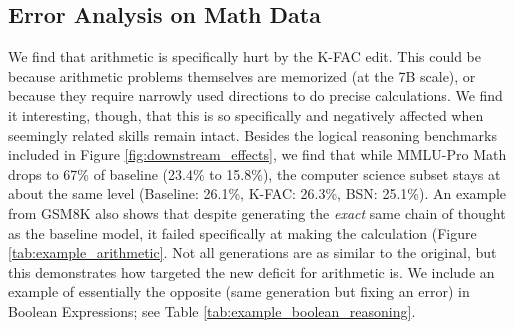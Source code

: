 \documentclass{article} %
\begin{document}
\subsection{Error Analysis on Math Data}
\label{sec:analysis_of_math}
We find that arithmetic is specifically hurt by the K-FAC edit. This could be because arithmetic problems themselves are memorized (at the 7B scale), or because they require narrowly used directions to do precise calculations. We find it interesting, though, that this is so specifically and negatively affected when seemingly related skills remain intact. Besides the logical reasoning benchmarks included in Figure \ref{fig:downstream_effects}, we find that while MMLU-Pro Math drops to 67\% of baseline (23.4\% to 15.8\%), the computer science subset stays at about the same level (Baseline:  26.1\%, K-FAC: 26.3\%, BSN: 25.1\%). 
An example from GSM8K also shows that despite generating the \textit{exact} same chain of thought as the baseline model, it failed specifically at making the calculation (Figure \ref{tab:example_arithmetic}. Not all generations are as similar to the original, but this demonstrates how targeted the new deficit for arithmetic is. We include an example of essentially the opposite (same generation but fixing an error) in Boolean Expressions; see Table \ref{tab:example_boolean_reasoning}.

\newcommand{\highlight}[1]{\colorbox{green!20}{#1}}
\newcommand{\errorhighlight}[1]{\colorbox{red!20}{#1}}
\end{document}
